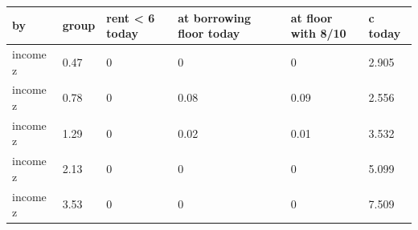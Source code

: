 \begingroup\small
\setlength{\tabcolsep}{3pt}
\renewcommand{\arraystretch}{1.04}
\begin{tabularx}{\linewidth}{XXXXXX}
\toprule
by & group & rent \textless{} 6 today & at borrowing floor today & at floor with 8/10 & c today \\
\midrule
income z & 0.47 & 0 & 0 & 0 & 2.905 \\
income z & 0.78 & 0 & 0.08 & 0.09 & 2.556 \\
income z & 1.29 & 0 & 0.02 & 0.01 & 3.532 \\
income z & 2.13 & 0 & 0 & 0 & 5.099 \\
income z & 3.53 & 0 & 0 & 0 & 7.509 \\
\bottomrule
\end{tabularx}
\endgroup
